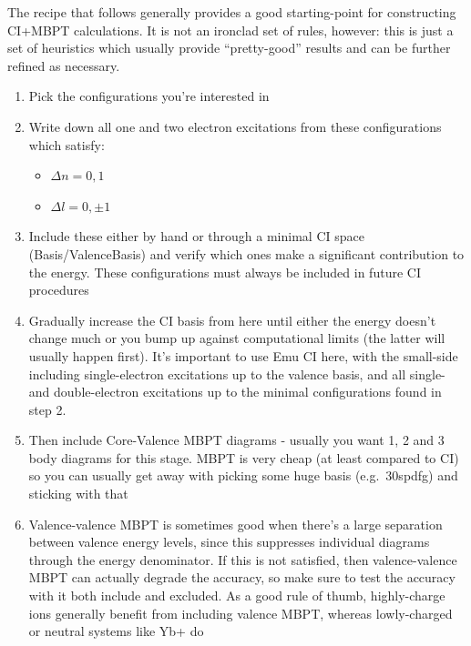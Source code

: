 \documentclass{report}
\begin{document}
The recipe that follows generally provides a good starting-point for constructing CI+MBPT calculations.
It is not an ironclad set of rules, however: this is just a set of heuristics which usually provide
``pretty-good'' results and can be further refined as necessary. 

\begin{enumerate}
\item
  Pick the configurations you're interested in\\
\item
  Write down all one and two electron excitations from these
  configurations which satisfy:

  \begin{itemize}
  \item
    $\Delta n = 0, 1$\\
  \item
    $\Delta l = 0, \pm 1$\\
  \end{itemize}
\item
  Include these either by hand or through a minimal CI space
  (Basis/ValenceBasis) and verify which ones make a significant
  contribution to the energy. These configurations must always be
  included in future CI procedures\\
\item
  Gradually increase the CI basis from here until either the energy
  doesn't change much or you bump up against computational limits (the latter will usually happen
  first). It's important to use Emu CI here, with the small-side including single-electron excitations
  up to the valence basis, and all single- and double-electron excitations up to the minimal
  configurations found in step 2.
\item
  Then include Core-Valence MBPT diagrams - usually you want 1, 2 and 3
  body diagrams for this stage. MBPT is very cheap (at least compared to
  CI) so you can usually get away with picking some huge basis
  (e.g.~30spdfg) and sticking with that\\
\item
  Valence-valence MBPT is sometimes good when there's a large separation
  between valence energy levels, since this suppresses individual
  diagrams through the energy denominator. If this is not satisfied,
  then valence-valence MBPT can actually degrade the accuracy, so make
  sure to test the accuracy with it both include and excluded. As a good
  rule of thumb, highly-charge ions generally benefit from including
  valence MBPT, whereas lowly-charged or neutral systems like Yb+ do

\end{enumerate}
\end{document}
